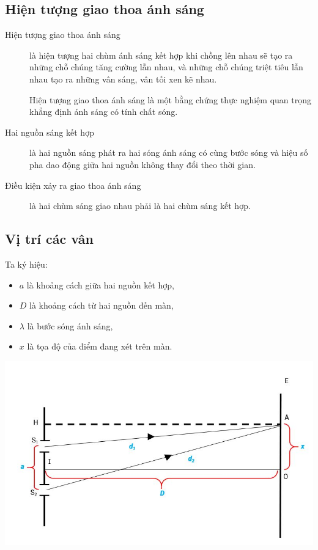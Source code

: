 \subsection{Hiện tượng giao thoa ánh sáng}
\begin{description}
	\item[Hiện tượng giao thoa ánh sáng] là hiện tượng hai chùm ánh sáng kết hợp khi chồng lên nhau sẽ tạo ra những chỗ chúng tăng cường lẫn nhau, và những chỗ chúng triệt tiêu lẫn nhau tạo ra những vân sáng, vân tối xen kẽ nhau. 
	
	Hiện tượng giao thoa ánh sáng là một bằng chứng thực nghiệm quan trọng khẳng định ánh sáng có tính chất sóng.
	\item[Hai nguồn sáng kết hợp] là hai nguồn sáng  phát ra hai sóng ánh sáng có cùng bước sóng và hiệu số pha dao động giữa hai nguồn không thay đổi theo thời gian.
	\item[Điều kiện xảy ra giao thoa ánh sáng] là hai chùm sáng giao nhau phải là hai chùm sáng kết hợp.
\end{description}



\subsection{Vị trí các vân}
Ta ký hiệu: 
\begin{itemize}
	\item $a$ là khoảng cách giữa hai nguồn kết hợp,
	\item $D$ là khoảng cách từ hai nguồn đến màn,
	\item $\lambda$ là bước sóng ánh sáng,
	\item $x$ là tọa độ của điểm đang xét trên màn.
\end{itemize}
\begin{center}
	\includegraphics[scale=0.7]{../figs/VN12-PH-33-L-020-1-1.JPG}
\end{center}

